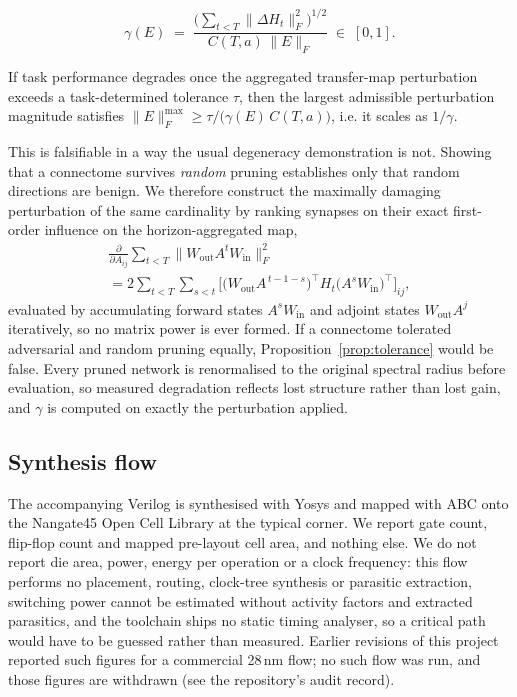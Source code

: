 \begin{definition}
\label{def:gamma}
\begin{equation}
\gamma(E) \;=\; \frac{\big(\sum_{t<T}\|\Delta H_t\|_F^{2}\big)^{1/2}}{C(T,a)\,\|E\|_F} \;\in\; [0,1].
\end{equation}
\end{definition}

\begin{proposition}
\label{prop:tolerance}
If task performance degrades once the aggregated transfer-map perturbation exceeds a
task-determined tolerance $\tau$, then the largest admissible perturbation magnitude
satisfies $\|E\|_F^{\max} \ge \tau / \big(\gamma(E)\,C(T,a)\big)$, i.e. it scales
as $1/\gamma$.
\end{proposition}

This is falsifiable in a way the usual degeneracy demonstration is not. Showing that
a connectome survives \emph{random} pruning establishes only that random directions
are benign. We therefore construct the maximally damaging perturbation of the same
cardinality by ranking synapses on their exact first-order influence on the
horizon-aggregated map,
\begin{multline}
\frac{\partial}{\partial A_{ij}} \sum_{t<T} \big\|W_{\mathrm{out}} A^{t} W_{\mathrm{in}}\big\|_F^{2} \\
= 2 \sum_{t<T} \sum_{s<t} \Big[ \big(W_{\mathrm{out}} A^{\,t-1-s}\big)^{\!\top} H_t
\big(A^{s} W_{\mathrm{in}}\big)^{\!\top} \Big]_{ij},
\end{multline}
evaluated by accumulating forward states $A^{s}W_{\mathrm{in}}$ and adjoint states
$W_{\mathrm{out}}A^{j}$ iteratively, so no matrix power is ever formed. If a
connectome tolerated adversarial and random pruning equally,
Proposition~\ref{prop:tolerance} would be false. Every pruned network is renormalised
to the original spectral radius before evaluation, so measured degradation reflects
lost structure rather than lost gain, and $\gamma$ is computed on exactly the
perturbation applied.

\subsection{Synthesis flow}
\label{sec:synth}

The accompanying Verilog is synthesised with Yosys \cite{wolf2013yosys} and mapped
with ABC \cite{ajaykumar2019abc} onto the Nangate45 Open Cell Library
\cite{nangate45} at the typical corner. We report gate count, flip-flop count and
mapped pre-layout cell area, and nothing else. We do not report die area, power,
energy per operation or a clock frequency: this flow performs no placement, routing,
clock-tree synthesis or parasitic extraction, switching power cannot be estimated
without activity factors and extracted parasitics, and the toolchain ships no static
timing analyser, so a critical path would have to be guessed rather than measured. Earlier revisions of
this project reported such figures for a commercial 28\,nm flow; no such flow was
run, and those figures are withdrawn (see the repository's audit record).
